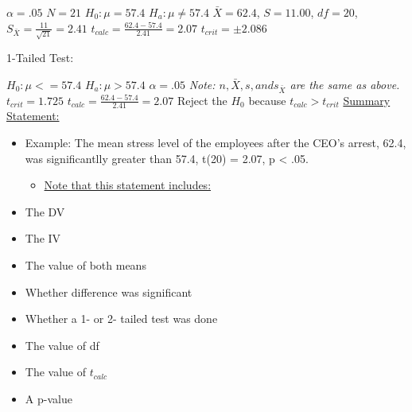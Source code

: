 \documentclass[11pt]{report}
\begin{document}
{
    $\alpha = .05$ \newline
    $N = 21$ \newline 
    $H_0: \mu = 57.4$ \newline 
    $H_a: \mu \neq 57.4$ \newline
    $\bar{X} = 62.4$, $S = 11.00$, $df = 20$, $S_{\bar{X}} = \frac{11}{\sqrt{21}} = 2.41$ \newline
    $t_{calc} = \frac{62.4 - 57.4}{2.41} = 2.07$ \newline
    $t_{crit} = \pm 2.086$ \newline

    1-Tailed Test: \newline 

    $H_0: \mu <= 57.4$ \newline
    $H_a: \mu > 57.4$ \newline
    $\alpha = .05$ \newline
    \textit{Note: $n, \bar{X}, s, and s_{\bar{X}}$ are the same as above.} \newline
    $t_{crit} = 1.725$ \newline
    $t_{calc} = \frac{62.4 - 57.4}{2.41} = 2.07$ \newline 
    Reject the $H_0$ because $t_{calc} > t_{crit}$ \newline\newline 
    \underline{Summary Statement:} \newline 
    \begin{itemize}
        \item Example: The mean stress level of the employees after the CEO's arrest, 62.4, was significantlly greater than 57.4, t(20) = 2.07, p < .05.
        \begin{itemize}
            \item \underline{Note that this statement includes:}
        \end{itemize}
        \item The DV 
        \item The IV 
        \item The value of both means
        \item Whether difference was significant 
        \item Whether a 1- or 2- tailed test was done 
        \item The value of df 
        \item The value of $t_{calc}$
        \item A p-value
    \end{itemize}
}
\end{document}
